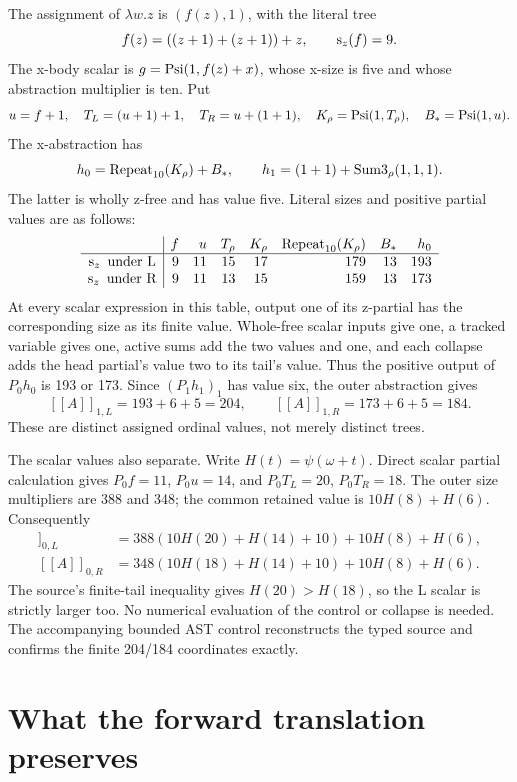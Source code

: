 The assignment of $\lambda w.z$ is $(f(z),1)$, with the literal tree
\[
 f(z)=((z+1)+(z+1))+z,\qquad\operatorname{s}_z(f)=9.
\]
The x-body scalar is $g=\operatorname{Psi}(1,f(z)+x)$, whose x-size is five and
whose abstraction multiplier is ten. Put
\[
 u=f+1,\quad T_L=(u+1)+1,\quad T_R=u+(1+1),\quad
 K_\rho=\operatorname{Psi}(1,T_\rho),\quad B_*=\operatorname{Psi}(1,u).
\]
The x-abstraction has
\[
 h_0=\operatorname{Repeat}_{10}(K_\rho)+B_*,\qquad
 h_1=(1+1)+\operatorname{Sum3}_\rho(1,1,1).
\]
The latter is wholly z-free and has value five. Literal sizes and
positive partial values are as follows:
\[
\begin{array}{c|rrrrrrr}
 &f&u&T_\rho&K_\rho&\operatorname{Repeat}_{10}(K_\rho)&B_*&h_0\\\hline
 \operatorname{s}_z\text{ under L}&9&11&15&17&179&13&193\\
 \operatorname{s}_z\text{ under R}&9&11&13&15&159&13&173
\end{array}
\]
At every scalar expression in this table, output one of its z-partial
has the corresponding size as its finite value. Whole-free scalar
inputs give one, a tracked variable gives one, active sums add the
two values and one, and each collapse adds the head partial's value
two to its tail's value. Thus the positive output of $P_0h_0$ is
193 or 173. Since $(P_1h_1)_1$ has value six, the outer abstraction gives
\[
 \boxed{\ [\![A]\!]_{1,L}=193+6+5=204,
 \qquad [\![A]\!]_{1,R}=173+6+5=184.\ }
\]
These are distinct assigned ordinal values, not merely distinct trees.

The scalar values also separate. Write $H(t)=\psi(\omega+t)$. Direct
scalar partial calculation gives $P_0f=11$, $P_0u=14$, and
$P_0T_L=20$, $P_0T_R=18$. The outer size multipliers are 388 and 348;
the common retained value is $10H(8)+H(6)$. Consequently
\begin{align*}
 [\![A]\!]_{0,L}&=388(10H(20)+H(14)+10)+10H(8)+H(6),\\
 [\![A]\!]_{0,R}&=348(10H(18)+H(14)+10)+10H(8)+H(6).
\end{align*}
The source's finite-tail inequality gives $H(20)>H(18)$, so the L
scalar is strictly larger too. No numerical evaluation of the control
or collapse is needed. The accompanying bounded AST control reconstructs
the typed source and confirms the finite 204/184 coordinates exactly.

\section{What the forward translation preserves}

